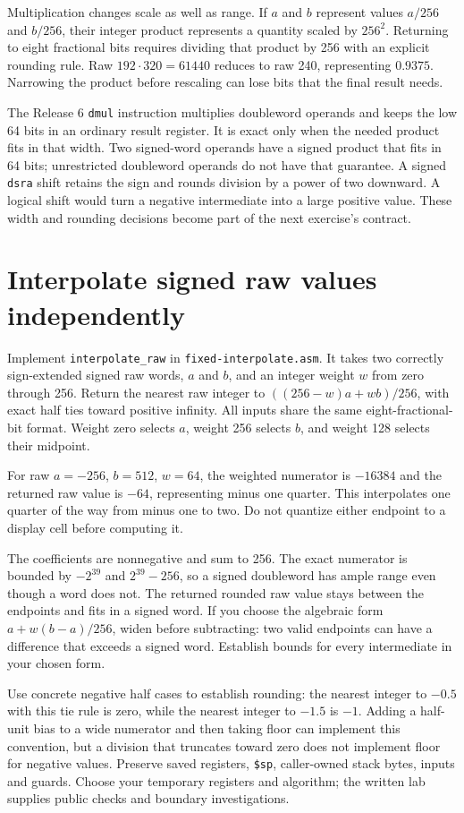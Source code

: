 Multiplication changes scale as well as range. If $a$ and $b$ represent values
$a/256$ and $b/256$, their integer product represents a quantity scaled by
$256^2$. Returning to eight fractional bits requires dividing that product by
256 with an explicit rounding rule. Raw $192\cdot320=61440$ reduces to raw 240,
representing $0.9375$. Narrowing the product before rescaling can lose bits that
the final result needs.

\begin{samepage}
  The Release 6 \texttt{dmul} instruction multiplies doubleword operands and keeps
  the low 64 bits in an ordinary result register. It is exact only when the needed
  product fits in that width. Two signed-word operands have a signed product that
  fits in 64 bits; unrestricted doubleword operands do not have that guarantee.
  A signed \texttt{dsra} shift retains the sign and rounds division by a power of
  two downward. A logical shift would turn a negative intermediate into a large
  positive value. These width and rounding decisions become part of the next
  exercise's contract.
  \par
\end{samepage}

\section{Interpolate signed raw values independently}

Implement \texttt{interpolate\_raw} in \texttt{fixed-interpolate.asm}. It takes
two correctly sign-extended signed raw words, $a$ and $b$, and an integer weight
$w$ from zero through 256. Return the nearest raw integer to
$((256-w)a+wb)/256$, with exact half ties toward positive infinity. All inputs
share the same eight-fractional-bit format. Weight zero selects $a$, weight 256
selects $b$, and weight 128 selects their midpoint.

For raw $a=-256$, $b=512$, $w=64$, the weighted numerator is $-16384$ and the
returned raw value is $-64$, representing minus one quarter. This interpolates
one quarter of the way from minus one to two. Do not quantize either endpoint
to a display cell before computing it.

The coefficients are nonnegative and sum to 256. The exact numerator is bounded
by $-2^{39}$ and $2^{39}-256$, so a signed doubleword has ample range even though
a word does not. The returned rounded raw value stays between the endpoints and
fits in a signed word. If you choose the algebraic form $a+w(b-a)/256$, widen
before subtracting: two valid endpoints can have a difference that exceeds a
signed word. Establish bounds for every intermediate in your chosen form.

Use concrete negative half cases to establish rounding: the nearest integer to
$-0.5$ with this tie rule is zero, while the nearest integer to $-1.5$ is $-1$.
Adding a half-unit bias to a wide numerator and then taking floor can implement
this convention, but a division that truncates toward zero does not implement
floor for negative values. Preserve saved registers, \texttt{\$sp}, caller-owned
stack bytes, inputs and guards. Choose your temporary registers and algorithm;
the written lab supplies public checks and boundary investigations.

